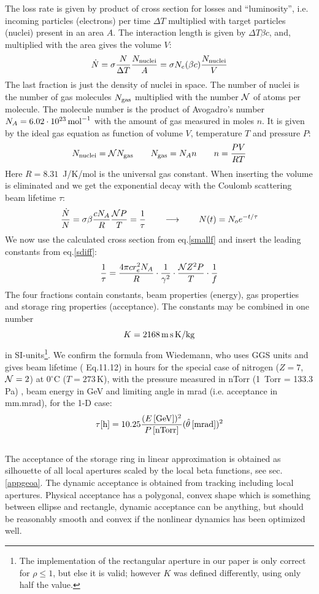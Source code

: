 \documentclass[12pt]{article}
\newcommand\beq{\begin{equation}}
\newcommand\eeq{\end{equation}}
\begin{document}
The loss rate is given by product of cross section for losses and ``luminosity'', i.e. incoming particles (electrons) per time $\Delta T$ multiplied with target particles (nuclei) present in an area $A$. The interaction length is given by $\Delta T \beta c$, and, multiplied with the area gives the volume $V$:
\beq\label{lossrate}
\dot N = \sigma \frac{N}{\Delta T}\frac{N_{\rm nuclei}}{A} = \sigma N_e  (\beta c) \frac{N_{\rm nuclei}}{V}
\eeq
The last fraction is just the density of nuclei in space.
The number of nuclei is the number of gas molecules $N_{\rm gas}$ multiplied with the number $\cal N$ of atoms per molecule. The molecule number is the product of Avogadro's number $N_A=6.02\cdot 10^{23}\,{\rm mol}^{-1}$ with the amount of gas measured in moles $n$. It is given by the ideal gas equation as function of volume $V$, temperature $T$ and pressure $P$:
\beq
N_{\rm nuclei} = {\cal N} N_{\rm gas}\qquad N_{\rm gas}=N_A n\qquad n = \frac{P V}{R T}
\eeq
Here $R=8.31$~J/K/mol is the universal gas constant. When inserting the volume is eliminated and we get the exponential decay with the Coulomb scattering beam lifetime $\tau$:
\beq
\frac{\dot N}{N} = \sigma \beta \frac{c N_A}{R}  \frac{{\cal N}P}{T} = \frac{1}{\tau}\qquad\longrightarrow\qquad N(t)=N_{o} e^{-t/\tau}
\eeq
We now use the calculated cross section from eq.\ref{smallf} and insert the leading constants from eq.\ref{sdiff}:
\beq\label{tauel}
\frac{1}{\tau} = \frac{4\pi c r_e^2 N_A}{R} \cdot \frac{1}{\gamma^2} \cdot \frac{ {\cal N} Z^2 P}{T} \cdot \frac{1}{f}
\eeq
The four fractions contain constants, beam properties (energy), gas properties and storage ring properties (acceptance). The constants may be combined in one number
\beq\label{kconst}
K = 2168\,{\rm m }\,{\rm s }\,{\rm K }/{\rm kg}
\eeq
in SI-units\footnote{The implementation of the rectangular aperture in our paper \cite{asaa06} is only correct for $\rho\leq 1$, but else it is valid; however $K$ was defined differently, using only half the value.}.
We confirm the formula from Wiedemann, who uses GGS units and gives beam lifetime (\cite{wiedemann} Eq.11.12) in hours for the special case of nitrogen ($Z=7$, ${\cal N}=2$) at $0^{\circ}$C ($T=273$\,K), with the pressure measured in nTorr (1~Torr = 133.3 Pa) , beam energy in GeV and limiting angle in mrad (i.e. acceptance in mm.mrad), for the 1-D case:
\beq
\tau {\rm [h]} = 10.25 \frac{(E\, {\rm [GeV]} )^2}{P\,{\rm [nTorr]}} (\hat\theta\, {\rm [mrad]})^2
\eeq
\\

The acceptance of the storage ring in linear approximation is obtained as silhouette of all local apertures scaled by the local beta functions, see sec.\ref{appgeoa}. The dynamic acceptance is obtained from tracking including local apertures. Physical acceptance has a polygonal, convex shape which is something between ellipse and rectangle, dynamic acceptance can be anything, but should be reasonably smooth and convex if the nonlinear dynamics has been optimized well.
\end{document}
